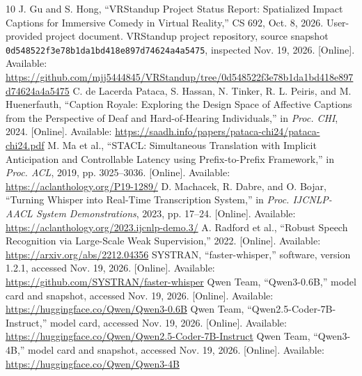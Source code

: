 \clearpage
\begin{thebibliography}{10}
 J. Gu and S. Hong, ``VRStandup Project Status Report: Spatialized Impact Captions for Immersive Comedy in Virtual Reality,'' CS 692, Oct. 8, 2026. User-provided project document.
 VRStandup project repository, source snapshot \texttt{0d548522f3e78b1da1bd418e897d74624a4a5475}, inspected Nov. 19, 2026. [Online]. Available: \url{https://github.com/mjj5444845/VRStandup/tree/0d548522f3e78b1da1bd418e897d74624a4a5475}
 C. de Lacerda Pataca, S. Hassan, N. Tinker, R. L. Peiris, and M. Huenerfauth, ``Caption Royale: Exploring the Design Space of Affective Captions from the Perspective of Deaf and Hard-of-Hearing Individuals,'' in \emph{Proc. CHI}, 2024. [Online]. Available: \url{https://saadh.info/papers/pataca-chi24/pataca-chi24.pdf}
 M. Ma et al., ``STACL: Simultaneous Translation with Implicit Anticipation and Controllable Latency using Prefix-to-Prefix Framework,'' in \emph{Proc. ACL}, 2019, pp. 3025--3036. [Online]. Available: \url{https://aclanthology.org/P19-1289/}
 D. Machacek, R. Dabre, and O. Bojar, ``Turning Whisper into Real-Time Transcription System,'' in \emph{Proc. IJCNLP-AACL System Demonstrations}, 2023, pp. 17--24. [Online]. Available: \url{https://aclanthology.org/2023.ijcnlp-demo.3/}
 A. Radford et al., ``Robust Speech Recognition via Large-Scale Weak Supervision,'' 2022. [Online]. Available: \url{https://arxiv.org/abs/2212.04356}
 SYSTRAN, ``faster-whisper,'' software, version 1.2.1, accessed Nov. 19, 2026. [Online]. Available: \url{https://github.com/SYSTRAN/faster-whisper}
 Qwen Team, ``Qwen3-0.6B,'' model card and snapshot, accessed Nov. 19, 2026. [Online]. Available: \url{https://huggingface.co/Qwen/Qwen3-0.6B}
 Qwen Team, ``Qwen2.5-Coder-7B-Instruct,'' model card, accessed Nov. 19, 2026. [Online]. Available: \url{https://huggingface.co/Qwen/Qwen2.5-Coder-7B-Instruct}
 Qwen Team, ``Qwen3-4B,'' model card and snapshot, accessed Nov. 19, 2026. [Online]. Available: \url{https://huggingface.co/Qwen/Qwen3-4B}
\end{thebibliography}

